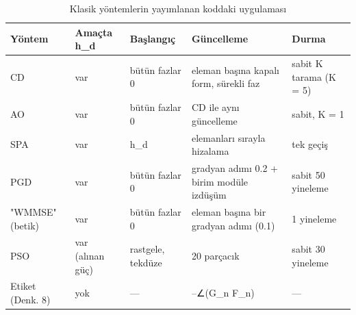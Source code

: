 \begin{table}[t]
\centering
\caption{Klasik yöntemlerin yayımlanan koddaki uygulaması}
\begin{tabular}{lllll}
\toprule
Yöntem & Amaçta h\_d & Başlangıç & Güncelleme & Durma \\
\midrule
CD & var & bütün fazlar 0 & eleman başına kapalı form, sürekli faz & sabit K tarama (K = 5) \\
AO & var & bütün fazlar 0 & CD ile aynı güncelleme & sabit, K = 1 \\
SPA & var & h\_d & elemanları sırayla hizalama & tek geçiş \\
PGD & var & bütün fazlar 0 & gradyan adımı 0.2 + birim modüle izdüşüm & sabit 50 yineleme \\
"WMMSE" (betik) & var & bütün fazlar 0 & eleman başına bir gradyan adımı (0.1) & 1 yineleme \\
PSO & var (alınan güç) & rastgele, tekdüze & 20 parçacık & sabit 30 yineleme \\
Etiket (Denk. 8) & yok & — & --∠(G\_n F\_n) & — \\
\bottomrule
\end{tabular}
\end{table}
